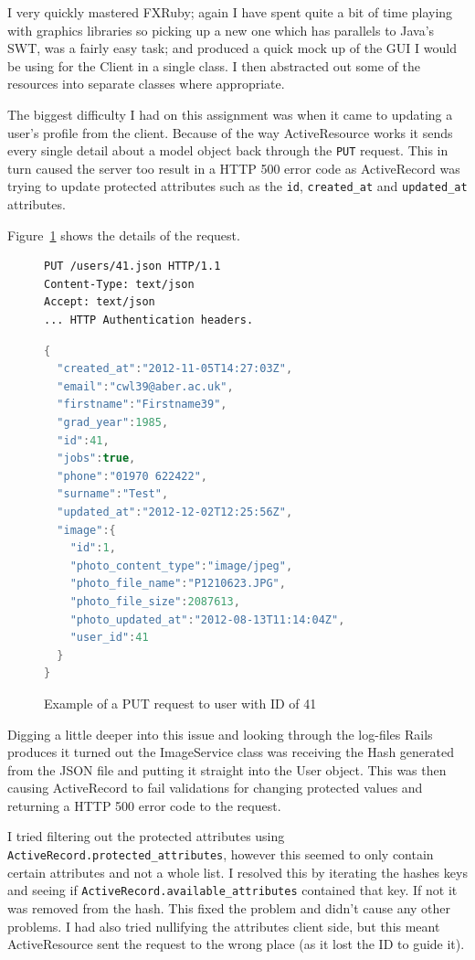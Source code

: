\documentclass{article}
\begin{document}
I very quickly mastered FXRuby; again I have spent quite a bit of time playing with 
graphics libraries so picking up a new one which has parallels to Java's SWT, was a 
fairly easy task; and produced a quick mock up of the GUI I would be using for the Client
in a single class. I then abstracted out some of the resources into separate classes 
where appropriate.

The biggest difficulty I had on this assignment was when it came to updating a user's
profile from the client. Because of the way ActiveResource works it sends every single 
detail about a model object back through the \verb$PUT$ request. This in turn caused the
server too result in a HTTP 500 error code as ActiveRecord was trying to update protected
attributes such as the \verb$id$, \verb$created_at$ and \verb$updated_at$ attributes.

Figure~\ref{fig:activeresource-to-activerrecord-500} shows the details of the request.

\begin{figure}[h]
\begin{verbatim}
PUT /users/41.json HTTP/1.1
Content-Type: text/json
Accept: text/json
... HTTP Authentication headers.
\end{verbatim}
\begin{lstlisting}[language=java]
{
  "created_at":"2012-11-05T14:27:03Z",
  "email":"cwl39@aber.ac.uk",
  "firstname":"Firstname39",
  "grad_year":1985,
  "id":41,
  "jobs":true,
  "phone":"01970 622422",
  "surname":"Test",
  "updated_at":"2012-12-02T12:25:56Z",
  "image":{
    "id":1,
    "photo_content_type":"image/jpeg",
    "photo_file_name":"P1210623.JPG",
    "photo_file_size":2087613,
    "photo_updated_at":"2012-08-13T11:14:04Z",
    "user_id":41
  }
}
\end{lstlisting}
\caption{Example of a PUT request to user with ID of 41}
\label{fig:activeresource-to-activerrecord-500}
\end{figure}

Digging a little deeper into this issue and looking through the log-files Rails produces
it turned out the ImageService class was receiving the Hash generated from the JSON file
and putting it straight into the User object. This was then causing ActiveRecord to fail
validations for changing protected values and returning a HTTP 500 error code to the 
request.

I tried filtering out the protected attributes using 
\verb$ActiveRecord.protected_attributes$, however this seemed to only contain certain 
attributes and not a whole list. I resolved this by iterating the hashes keys and seeing 
if \verb$ActiveRecord.available_attributes$ contained that key. If not it was removed 
from the hash. This fixed the problem and didn't cause any other problems. I had also 
tried nullifying the attributes client side, but this meant ActiveResource sent the 
request to the wrong place (as it lost the ID to guide it).

\clearpage


\end{document}
